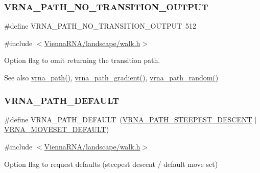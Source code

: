\subsubsection{\texorpdfstring{VRNA\_PATH\_NO\_TRANSITION\_OUTPUT}{VRNA\_PATH\_NO\_TRANSITION\_OUTPUT}}
{\footnotesize\ttfamily \#define V\+R\+N\+A\+\_\+\+P\+A\+T\+H\+\_\+\+N\+O\+\_\+\+T\+R\+A\+N\+S\+I\+T\+I\+O\+N\+\_\+\+O\+U\+T\+P\+UT~512}



{\ttfamily \#include $<$\mbox{\hyperlink{landscape_2walk_8h}{Vienna\+R\+N\+A/landscape/walk.\+h}}$>$}



Option flag to omit returning the transition path. 

\begin{DoxySeeAlso}{See also}
\mbox{\hyperlink{group__paths__walk_gaef7afadc36933b80706de49fe36e7b94}{vrna\+\_\+path()}}, \mbox{\hyperlink{group__paths__walk_ga9594d7424dbe301f0dd3f4900db0f05c}{vrna\+\_\+path\+\_\+gradient()}}, \mbox{\hyperlink{group__paths__walk_ga98fdc3f5cfa36a12738c2ec1ce024570}{vrna\+\_\+path\+\_\+random()}} 
\end{DoxySeeAlso}
\mbox{\label{group__paths__walk_gaf1bb1f8fec8d24e3b821f621b19f77b4}} 
\subsubsection{\texorpdfstring{VRNA\_PATH\_DEFAULT}{VRNA\_PATH\_DEFAULT}}
{\footnotesize\ttfamily \#define V\+R\+N\+A\+\_\+\+P\+A\+T\+H\+\_\+\+D\+E\+F\+A\+U\+LT~(\mbox{\hyperlink{group__paths__walk_ga705cea2b3243a38a2d6e3b1e141ed061}{V\+R\+N\+A\+\_\+\+P\+A\+T\+H\+\_\+\+S\+T\+E\+E\+P\+E\+S\+T\+\_\+\+D\+E\+S\+C\+E\+NT}} $\vert$ \mbox{\hyperlink{group__neighbors_gaa5ffec4dd0d02df320f123e6888154d1}{V\+R\+N\+A\+\_\+\+M\+O\+V\+E\+S\+E\+T\+\_\+\+D\+E\+F\+A\+U\+LT}})}



{\ttfamily \#include $<$\mbox{\hyperlink{landscape_2walk_8h}{Vienna\+R\+N\+A/landscape/walk.\+h}}$>$}



Option flag to request defaults (steepest descent / default move set) 

